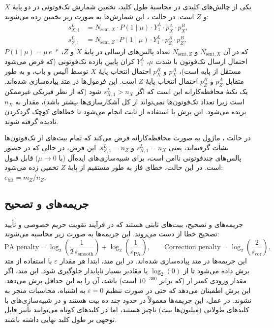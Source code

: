یکی از چالش‌های کلیدی در محاسبۀ طول کلید، تخمین شمارش تک‌فوتونی در دو پایۀ $X$ و $Z$ است. در حالت ، این شمارش‌ها به صورت زیر تخمین زده می‌شوند:
\begin{align}
	s_{X,1}^L &= N_{\text{sent},X} \cdot P(1 \mid \mu) \cdot Y_1^L \cdot p_X^A \cdot p_X^B, \\
	s_{Z,1}^L &= N_{\text{sent},Z} \cdot P(1 \mid \mu) \cdot Y_1^L \cdot p_Z^A \cdot p_Z^B,
\end{align}
که در آن $N_{\text{sent},X}$ و $N_{\text{sent},Z}$ تعداد پالس‌های ارسالی در پایۀ $X$ و $Z$، $P(1 \mid \mu) = \mu\,e^{-\mu}$ احتمال ارسال تک‌فوتون با شدت $\mu$، $Y_1^L$ کران پایین بازده تک‌فوتونی (که فرض می‌شود مستقل از پایه است)، $p_X^A$ و $p_X^B$ احتمال انتخاب پایۀ $X$ توسط آلیس و باب، و به طور متقابل $p_Z^A$ و $p_Z^B$ احتمال انتخاب پایۀ $Z$ است. این فرمول‌ها در متد  پیاده‌سازی شده‌اند. یک نکتۀ محافظه‌کارانه این است که اگر $s_{X,1}^L > n_X$ شود (که از نظر فیزیکی غیرممکن است زیرا تعداد تک‌فوتون‌ها نمی‌تواند از کل آشکارسازی‌ها بیشتر باشد)، مقدار به $n_X$ بریده می‌شود. این برش با استفاده از ثابت  انجام می‌شود تا خطاهای کوچک گردکردن نادیده گرفته شوند.

در حالت ، ماژول به صورت محافظه‌کارانه فرض می‌کند که تمام بیت‌های  از تک‌فوتون‌ها نشأت گرفته‌اند، یعنی $s_{X,1}^L = n_X$ و $s_{Z,1}^L = n_Z$. این فرض، در حالی که در حضور پالس‌های چندفوتونی ناامن است، برای شبیه‌سازی‌های  ایده‌آل (با $\mu \to 0$) قابل قبول است. در این حالت، خطای فاز به طور مستقیم از  پایۀ $Z$ تخمین زده می‌شود: $e_{\text{bit}} = m_Z / n_Z$.

\subsection{جریمه‌های  و تصحیح}

جریمه‌های  و تصحیح، بیت‌های ثابتی هستند که در فرآیند تقویت حریم خصوصی و تأیید تصحیح خطا از دست می‌روند. این جریمه‌ها به صورت زیر محاسبه می‌شوند:
\begin{equation}
	\text{PA penalty} = \log_2\!\left(\frac{1}{2\,\varepsilon_{\text{smooth}}}\right) + \log_2\!\left(\frac{1}{\varepsilon_{\text{PA}}}\right), \qquad \text{Correction penalty} = \log_2\!\left(\frac{2}{\varepsilon_{\text{cor}}}\right).
\end{equation}
این جریمه‌ها در متد  پیاده‌سازی شده‌اند. در این متد، ابتدا هر مقدار $\varepsilon$ با استفاده از متد  برش داده می‌شود تا از $\log_2(0)$ یا مقادیر بسیار ناپایدار جلوگیری شود. این متد، اگر مقدار ورودی کمتر از  (که برابر $10^{-300}$ است) باشد، آن را به این حداقل برش می‌دهد. این برش اطمینان می‌دهد که حتی در صورت تنظیم $\varepsilon = 0$ به اشتباه، محاسبات منجر به \lr{$-\infty$} نشوند. در عمل، این جریمه‌ها معمولاً در حدود چند ده بیت هستند و در شبیه‌سازی‌های با کلیدهای طولانی (میلیون‌ها بیت) ناچیز هستند، اما در کلیدهای کوتاه می‌توانند تأثیر قابل توجهی بر طول کلید نهایی داشته باشند.


